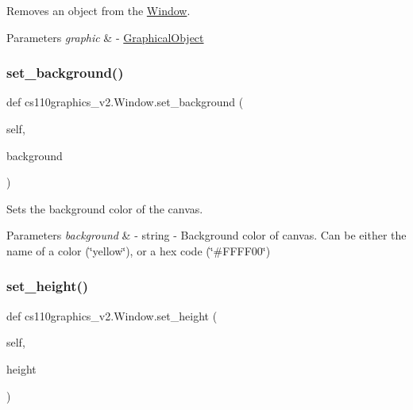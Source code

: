 Removes an object from the \mbox{\hyperlink{classcs110graphics__v2_1_1Window}{Window}}. 


\begin{DoxyParams}{Parameters}
{\em graphic} & -\/ \mbox{\hyperlink{classcs110graphics__v2_1_1GraphicalObject}{Graphical\+Object}} \\
\hline
\end{DoxyParams}
\mbox{\label{classcs110graphics__v2_1_1Window_a9d2ea5c7a8da999677a093016d012733}} 
\subsubsection{\texorpdfstring{set\_background()}{set\_background()}}
{\footnotesize\ttfamily def cs110graphics\+\_\+v2.\+Window.\+set\+\_\+background (\begin{DoxyParamCaption}\item[{}]{self,  }\item[{}]{background }\end{DoxyParamCaption})}



Sets the background color of the canvas. 


\begin{DoxyParams}{Parameters}
{\em background} & -\/ string -\/ Background color of canvas. Can be either the name of a color (\char`\"{}yellow\char`\"{}), or a hex code (\char`\"{}\#\+F\+F\+F\+F00\char`\"{}) \\
\hline
\end{DoxyParams}
\mbox{\label{classcs110graphics__v2_1_1Window_aff1c2aa712e6ed9c444ebce3c8501c5a}} 
\subsubsection{\texorpdfstring{set\_height()}{set\_height()}}
{\footnotesize\ttfamily def cs110graphics\+\_\+v2.\+Window.\+set\+\_\+height (\begin{DoxyParamCaption}\item[{}]{self,  }\item[{}]{height }\end{DoxyParamCaption})}



